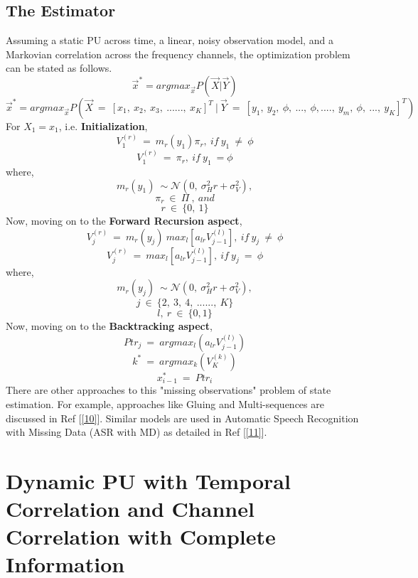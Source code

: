 \documentclass[12pt, draftcls, onecolumn]{IEEEtran}
\begin{document}
\subsection{The Estimator}
Assuming a static PU across time, a linear, noisy observation model, and a Markovian correlation across the frequency channels, the optimization problem can be stated as follows.
\begin{equation}\label{32}
    \vec{x}^* = argmax_{\vec{x}} P(\vec{X}|\vec{Y})
\end{equation}
\[\vec{x}^* = argmax_{\vec{x}} P(\vec{X}\ =\ [x_1,\ x_2,\ x_3,\ ......,\ x_K]^T\ |\ \vec{Y}\ =\ [y_1,\ y_2,\ \phi,\ ...,\ \phi,....,\ y_m,\ \phi,\ ...,\ y_K]^T)\]
For $X_1 = x_1$, i.e. \textbf{Initialization},
\[V_1^{(r)}\ =\ m_r(y_1)\pi_r,\ if\ y_1\ \neq\ \phi\]
\[V_1^{(r)}\ =\ \pi_r,\ if\ y_1\ = \phi\]
where,
\[m_r(y_1)\ \sim \mathcal{N}(0,\ \sigma_H^2r+\sigma_V^2),\]
\[\pi_r\ \in\ \Pi\ ,\ and\]
\[r\ \in\ \{0,\ 1\}\]
Now, moving on to the \textbf{Forward Recursion aspect},
\[V_j^{(r)}\ =\ m_r(y_j)\ max_l[a_{lr}V_{j-1}^{(l)}],\ if\ y_j\ \neq\ \phi\]
\[V_j^{(r)}\ =\ max_l[a_{lr}V_{j-1}^{(l)}],\ if\ y_j\ =\ \phi\]
where,
\[m_r(y_j)\ \sim \mathcal{N}(0,\ \sigma_H^2r+\sigma_V^2),\]
\[j\ \in\ \{2,\ 3,\ 4,\ ......,\ K\}\]
\[l,\ r\ \in\ \{0,1\}\]
Now, moving on to the \textbf{Backtracking aspect},
\[Ptr_j\ =\ argmax_l(a_{lr}V_{j-1}^{(l)})\]
\[k^*\ =\ argmax_k(V_K^{(k)})\]
\[x_{i-1}^*\ =\ Ptr_i\]
There are other approaches to this "missing observations" problem of state estimation. For example, approaches like Gluing and Multi-sequences are discussed in Ref [\ref{10}]. Similar models are used in Automatic Speech Recognition with Missing Data (ASR with MD) as detailed in Ref [\ref{11}].
\section{Dynamic PU with Temporal Correlation and Channel Correlation with Complete Information}
\end{document}
